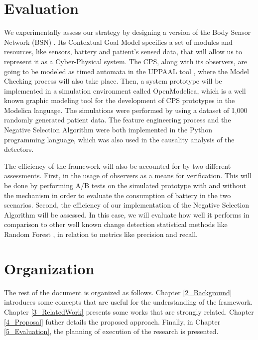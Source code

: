 \section{Evaluation}

We experimentally assess our strategy by designing a version of the Body Sensor Network (BSN) \cite{2021BSN}. Its Contextual Goal Model specifies a set of modules and resources, like sensors, battery and patient's sensed data, that will allow us to represent it as a Cyber-Physical system. The CPS, along with its observers, are going to be modeled as timed automata in the UPPAAL tool \cite{UPPAAL}, where the Model Checking process will also take place. Then, a system prototype will be implemented in a simulation environment called OpenModelica, which is a well known graphic modeling tool for the development of CPS prototypes in the Modelica language. %
The simulations were performed by using a dataset of 1,000 randomly generated patient data. The feature engineering process and the Negative Selection Algorithm were both implemented in the Python programming language, which was also used in the causality analysis of the detectors.

The efficiency of the framework will also be accounted for by two different assessments. First, in the usage of observers as a means for verification. This will be done by performing A/B tests on the simulated prototype with and without the mechanism in order to evaluate the consumption of battery in the two scenarios. Second, the efficiency of our implementation of the Negative Selection Algorithm will be assessed. In this case, we will evaluate how well it performs in comparison to other well known change detection statistical methods like Random Forest %
, in relation to metrics like precision and recall.

\section{Organization}
The rest of the document is organized as follows. Chapter \ref{2_Background} introduces some concepts that are useful for the understanding of the framework. Chapter \ref{3_RelatedWork} presents some works that are strongly related. Chapter \ref{4_Proposal} futher details the proposed approach. Finally, in Chapter \ref{5_Evaluation}, the planning of execution of the research is presented.